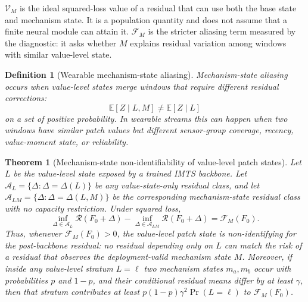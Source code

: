 ﻿\documentclass[10pt,conference]{IEEEtran}
\newtheorem{definition}{Definition}
\newtheorem{theorem}{Theorem}
\newcommand{\E}{\mathbb{E}}
\begin{document}
\(\mathcal{V}_M\) is the ideal squared-loss value of a residual that can use
both the base state and mechanism state.  It is a population quantity and does
not assume that a finite neural module can attain it.  \(\mathcal{F}_M\) is the stricter
aliasing term measured by the diagnostic: it asks whether \(M\) explains
residual variation among windows with similar value-level state.

\begin{definition}[Wearable mechanism-state aliasing]
Mechanism-state aliasing occurs when value-level states merge windows that require
different residual corrections:
\begin{equation}
\E[Z\mid L,M]\ne \E[Z\mid L]
\end{equation}
on a set of positive probability.  In wearable streams this can happen when
two windows have similar patch values but different sensor-group coverage,
recency, value-moment state, or reliability.
\end{definition}

\begin{theorem}[Mechanism-state non-identifiability of value-level patch states]
\label{thm:alias}
Let \(L\) be the value-level state exposed by a trained IMTS backbone.  Let
\(\mathcal{A}_L=\{\Delta:\Delta=\Delta(L)\}\) be any
value-state-only residual class, and let
\(\mathcal{A}_{LM}=\{\Delta:\Delta=\Delta(L,M)\}\) be the corresponding
mechanism-state residual class with no capacity restriction.  Under squared
loss,
\begin{equation}
\inf_{\Delta\in\mathcal{A}_L}\mathcal{R}(F_0+\Delta)
-
\inf_{\Delta\in\mathcal{A}_{LM}}\mathcal{R}(F_0+\Delta)
=
\mathcal{F}_M(F_0).
\end{equation}
Thus, whenever \(\mathcal{F}_M(F_0)>0\), the value-level patch state is
non-identifying for the post-backbone residual: no residual depending only on
\(L\) can match the risk of a residual that observes the deployment-valid
mechanism state \(M\).
Moreover, if inside any value-level stratum \(L=\ell\) two mechanism states
\(m_a,m_b\) occur with probabilities \(p\) and \(1-p\), and their conditional
residual means differ by at least \(\gamma\), then that stratum contributes at
least \(p(1-p)\gamma^2\Pr(L=\ell)\) to \(\mathcal{F}_M(F_0)\).
\end{theorem}
\end{document}
